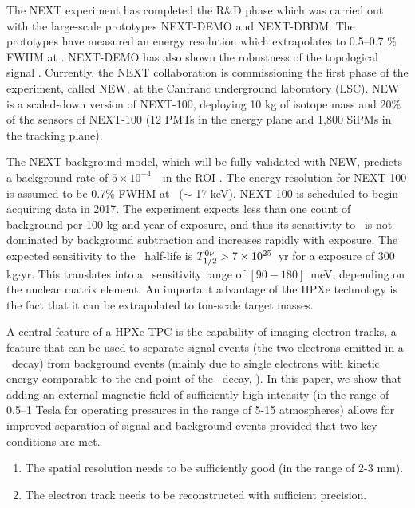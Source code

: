 \documentclass{JINST}
\begin{document}
The NEXT experiment has completed the R\&D phase which was carried out with the large-scale prototypes NEXT-DEMO and NEXT-DBDM. The prototypes have measured an energy resolution which extrapolates to 0.5--0.7 \% FWHM at \Qbb. NEXT-DEMO has also shown the robustness of the topological signal \cite{Alvarez:2012xda,Alvarez:2012kua,Alvarez:2013gxa,Lorca:2014sra}. Currently, the NEXT collaboration is commissioning the first phase of the experiment, called NEW, at the Canfranc underground laboratory (LSC). NEW is a scaled-down version of NEXT-100, deploying 10 kg of isotope mass and 20\% of the sensors of NEXT-100 (12 PMTs in the energy plane and  1,800 SiPMs in the tracking plane).

The NEXT background model, which will be fully validated with NEW, predicts a background rate of $5 \times 10^{-4}$~\ckky\ in the ROI \cite{Nebot-Guinot:2014raa}. The energy resolution for NEXT-100 is assumed to be 0.7\% FWHM at \Qbb\ ($\sim$ 17 keV). NEXT-100 is scheduled to begin acquiring data in 2017. The experiment expects less than one count of background per 100 kg and year of exposure, and thus its sensitivity to \Tonu\ is not dominated by background subtraction and increases rapidly with exposure. The expected sensitivity to the \bbonu\ half-life is $T_{1/2}^{0\nu} > 7 \times 10^{25}$~yr for a exposure of 300 kg$\cdot$yr. This translates into a \mbb\ sensitivity range of $[90-180]$~meV, depending on the nuclear matrix element. An important advantage of the HPXe technology is the fact that it can be extrapolated to ton-scale target masses.


A central feature of a HPXe TPC is the capability of imaging electron tracks, a feature that can be used to separate signal events (the two electrons emitted in a \bbonu\ decay) from background events (mainly due to single electrons with kinetic energy comparable to the end-point of the \bbonu\ decay, \Qbb). In this paper, we show that adding an external magnetic field of sufficiently high intensity (in the range of 0.5--1 Tesla for operating pressures in the range of 5-15 atmospheres) allows for improved separation of signal and background events provided that two key conditions are met. 
\begin{enumerate}
\item The spatial resolution needs to be sufficiently good (in the range of 2-3 mm). 
\item The electron track needs to be reconstructed with sufficient precision. 
\end{enumerate}
\end{document}
